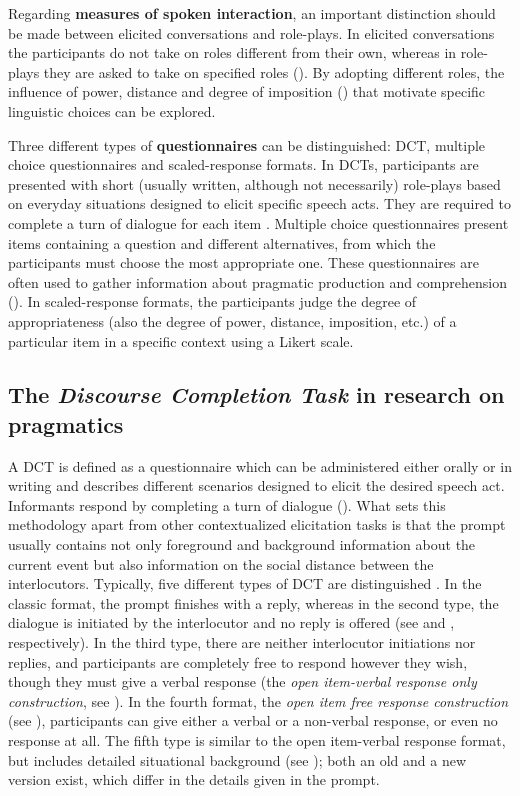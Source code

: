 \documentclass[output=paper]{LSP/langsci}
\begin{document}
Regarding \textbf{measures of spoken interaction}, an important distinction should be made between elicited conversations and role-plays. In elicited conversations the participants do not take on roles different from their own, whereas in role-plays they are asked to take on specified roles (\citealt{kasper2002}). By adopting different roles, the influence of power, distance and degree of imposition (\citealt{Brown1987}) that motivate specific linguistic choices can be explored.

Three different types of \textbf{questionnaires} can be distinguished: DCT, multiple choice questionnaires and scaled-response formats. In DCTs, participants are presented with short (usually written, although not necessarily) role-plays based on everyday situations designed to elicit specific speech acts. They are required to complete a turn of dialogue for each item \citep{Barron2003}. Multiple choice questionnaires present items containing a question and different alternatives, from which the participants must choose the most appropriate one. These questionnaires are often used to gather information about pragmatic production and comprehension  (\citealt{kasper2002}). In scaled-response formats, the participants judge the degree of appropriateness (also the degree of power, distance, imposition, etc.) of a particular item in a specific context using a Likert scale.

\subsection{The \textit{Discourse Completion Task} in research on pragmatics}
\label{sec:van:1.2}
A DCT is defined as a questionnaire which can be administered either orally or in writing and describes different scenarios designed to elicit the desired speech act. Informants respond by completing a turn of dialogue (\citealt{Kasper1991,Brown2001}). What sets this methodology apart from other contextualized elicitation tasks is that the prompt usually contains not only foreground and background information about the current event but also information on the social distance between the interlocutors. Typically, five different types of DCT are distinguished \citep{Nurani2009}. In the classic format, the prompt finishes with a reply, whereas in the second type, the dialogue is initiated by the interlocutor and no reply is offered (see  and , respectively). In the third type, there are neither interlocutor initiations nor replies, and participants are completely free to respond however they wish, though they must give a verbal response (the \textit{open item-verbal response only construction}, see ). In the fourth format, the \textit{open item free response construction} (see ),  participants can give either a verbal or a non-verbal response, or even no response at all. The fifth type is similar to the open item-verbal response format, but includes detailed situational background (see ); both an old and a new version exist, which differ in the details given in the prompt. 
\end{document}
